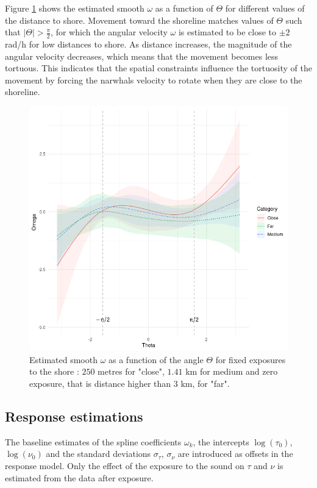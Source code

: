 \documentclass[11pt]{article}
\newcommand {\1}{\mathbb{1}}
\theoremstyle{definition}
\theoremstyle{remark}
\theoremstyle{remark}
\begin{document}
Figure \ref{fig:febaseline3omegaanglenormalq0} shows the estimated smooth $\omega$ as a function of $\Theta$ for different values of the distance to shore. Movement toward the shoreline matches values of $\Theta$ such that $\vert \Theta \vert > \frac{\pi}{2}$, for which the angular velocity $\omega$ is estimated to be close to $\pm 2$ rad/h for low distances to shore. As distance increases, the magnitude of the angular velocity decreases, which means that the movement becomes less tortuous. This indicates that the spatial constraints influence the tortuosity of the movement by forcing the narwhals velocity to rotate when they are close to the shoreline.
\begin{figure}[H]
	\centering
	\includegraphics[width=0.7\linewidth]{"images/application/baseline/omega_DistanceShore_levels.png"}
	\caption{Estimated smooth $\omega$ as a function of the angle $\Theta$ for fixed exposures to the shore : $250$ metres for "close", $1.41$ km for medium and zero exposure, that is distance higher than $3$ km, for "far".}

	\label{fig:febaseline3omegaanglenormalq0}
\end{figure}



\subsection{Response estimations}

The baseline estimates of the spline coefficients $\omega_k$, the intercepts $\log(\tau_0)$, $\log(\nu_0)$ and the standard deviations $\sigma_{\tau}$, $\sigma_{\nu}$ are introduced as offsets in the response model. Only the effect of the exposure to the sound on $\tau$ and $\nu$ is estimated from the data after exposure.\\
\end{document}

